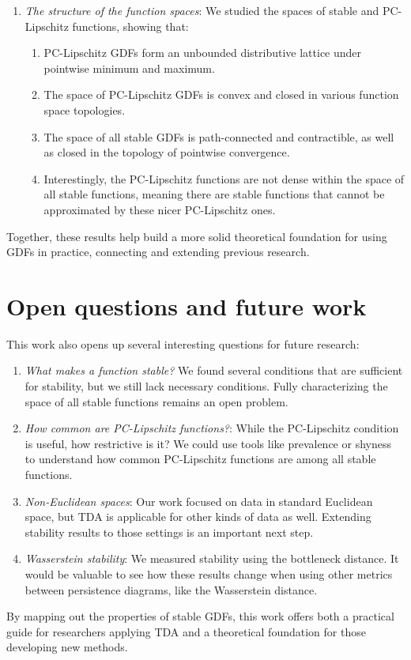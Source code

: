 \begin{enumerate}
    \item \emph{The structure of the function spaces}: We studied the spaces of
    stable and PC-Lipschitz functions, showing that:

    \begin{enumerate}
        \item PC-Lipschitz GDFs form an unbounded distributive lattice under pointwise
        minimum and maximum.
        \item The space of PC-Lipschitz GDFs is convex and closed in various function
        space topologies.
        \item The space of all stable GDFs is path-connected and contractible,
        as well as closed in the topology of pointwise convergence.
        \item Interestingly, the PC-Lipschitz functions are not dense within the
        space of all stable functions, meaning there are stable functions
        that cannot be approximated by these nicer PC-Lipschitz ones.
    \end{enumerate}
\end{enumerate}

Together, these results help build a more solid theoretical foundation for using
GDFs in practice, connecting and extending previous research.

\section{Open questions and future work}

This work also opens up several interesting questions for future research:

\begin{enumerate}
    \item \emph{What makes a function stable?} We found several conditions that
    are sufficient for stability, but we still lack necessary conditions. Fully
    characterizing the space of all stable functions remains an open problem.
    
    \item \emph{How common are PC-Lipschitz functions?}: While the PC-Lipschitz
    condition is useful, how restrictive is it? We could use tools like
    prevalence or shyness to understand how common PC-Lipschitz functions are
    among all stable functions.

    \item \emph{Non-Euclidean spaces}: Our work focused on data in standard
    Euclidean space, but TDA is applicable for other kinds of data as well.
    Extending stability results to those settings is an important next step.
    
    \item \emph{Wasserstein stability}: We measured stability using the
    bottleneck distance. It would be valuable to see how these results change
    when using other metrics between persistence diagrams, like the Wasserstein
    distance.
\end{enumerate}

By mapping out the properties of stable GDFs, this work offers both a practical
guide for researchers applying TDA and a theoretical foundation for those
developing new methods.